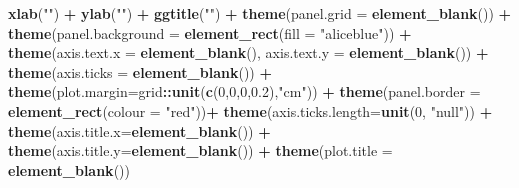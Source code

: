 \documentclass[12pt,oneside]{reedthesis}
\newenvironment{Shaded}{\begin{snugshade}}{\end{snugshade}}
\newcommand{\DataTypeTok}[1]{\textcolor[rgb]{0.13,0.29,0.53}{#1}}
\newcommand{\DecValTok}[1]{\textcolor[rgb]{0.00,0.00,0.81}{#1}}
\newcommand{\FloatTok}[1]{\textcolor[rgb]{0.00,0.00,0.81}{#1}}
\newcommand{\KeywordTok}[1]{\textcolor[rgb]{0.13,0.29,0.53}{\textbf{#1}}}
\newcommand{\NormalTok}[1]{#1}
\newcommand{\OperatorTok}[1]{\textcolor[rgb]{0.81,0.36,0.00}{\textbf{#1}}}
\newcommand{\StringTok}[1]{\textcolor[rgb]{0.31,0.60,0.02}{#1}}
\begin{document}
\begin{Shaded}
\begin{Highlighting}[]
\StringTok{  }\KeywordTok{xlab}\NormalTok{(}\StringTok{""}\NormalTok{) }\OperatorTok{+}\StringTok{ }
\StringTok{  }\KeywordTok{ylab}\NormalTok{(}\StringTok{""}\NormalTok{) }\OperatorTok{+}\StringTok{ }
\StringTok{  }\KeywordTok{ggtitle}\NormalTok{(}\StringTok{""}\NormalTok{) }\OperatorTok{+}
\StringTok{  }\KeywordTok{theme}\NormalTok{(}\DataTypeTok{panel.grid =} \KeywordTok{element_blank}\NormalTok{()) }\OperatorTok{+}
\StringTok{  }\KeywordTok{theme}\NormalTok{(}\DataTypeTok{panel.background =} \KeywordTok{element_rect}\NormalTok{(}\DataTypeTok{fill =} \StringTok{"aliceblue"}\NormalTok{)) }\OperatorTok{+}
\StringTok{  }\KeywordTok{theme}\NormalTok{(}\DataTypeTok{axis.text.x =} \KeywordTok{element_blank}\NormalTok{(), }\DataTypeTok{axis.text.y =} \KeywordTok{element_blank}\NormalTok{()) }\OperatorTok{+}
\StringTok{  }\KeywordTok{theme}\NormalTok{(}\DataTypeTok{axis.ticks =} \KeywordTok{element_blank}\NormalTok{()) }\OperatorTok{+}
\StringTok{  }\KeywordTok{theme}\NormalTok{(}\DataTypeTok{plot.margin=}\NormalTok{grid}\OperatorTok{::}\KeywordTok{unit}\NormalTok{(}\KeywordTok{c}\NormalTok{(}\DecValTok{0}\NormalTok{,}\DecValTok{0}\NormalTok{,}\DecValTok{0}\NormalTok{,}\FloatTok{0.2}\NormalTok{),}\StringTok{"cm"}\NormalTok{)) }\OperatorTok{+}\StringTok{ }
\StringTok{  }\KeywordTok{theme}\NormalTok{(}\DataTypeTok{panel.border =} \KeywordTok{element_rect}\NormalTok{(}\DataTypeTok{colour =} \StringTok{"red"}\NormalTok{))}\OperatorTok{+}
\StringTok{  }\KeywordTok{theme}\NormalTok{(}\DataTypeTok{axis.ticks.length=}\KeywordTok{unit}\NormalTok{(}\DecValTok{0}\NormalTok{, }\StringTok{"null"}\NormalTok{)) }\OperatorTok{+}
\StringTok{  }\KeywordTok{theme}\NormalTok{(}\DataTypeTok{axis.title.x=}\KeywordTok{element_blank}\NormalTok{()) }\OperatorTok{+}
\StringTok{  }\KeywordTok{theme}\NormalTok{(}\DataTypeTok{axis.title.y=}\KeywordTok{element_blank}\NormalTok{()) }\OperatorTok{+}
\StringTok{  }\KeywordTok{theme}\NormalTok{(}\DataTypeTok{plot.title =} \KeywordTok{element_blank}\NormalTok{())}


\end{Highlighting}
\end{Shaded}
\end{document}
